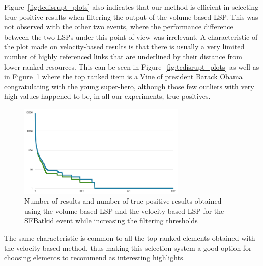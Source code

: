 \documentclass{sig-alternate}
\begin{document}
Figure~\ref{fig:tcdisrupt_plots} also indicates that our method is efficient in selecting true-positive results when filtering the output of the volume-based LSP. This was not observed with the other two events, where the performance difference between the two LSPs under this point of view was irrelevant. A characteristic of the plot made on velocity-based results is that there is usually a very limited number of highly referenced links that are underlined by their distance from lower-ranked resources. This can be seen in Figure~\ref{fig:tcdisrupt_plots} as well as in Figure~\ref{fig:sfbatkid_plot} where the top ranked item is a Vine of president Barack Obama congratulating with the young super-hero, although those few outliers with very high values happened to be, in all our experiments, true positives.
\begin{figure}[htbp]
  \centering
  \includegraphics[width=8cm]{Figures/batkid_plot.png}
  \caption{Number of results and number of true-positive results obtained using the volume-based LSP and the velocity-based LSP for the SFBatkid event while increasing the filtering thresholds}
  \label{fig:sfbatkid_plot}
\end{figure}

The same characteristic is common to all the top ranked elements obtained with the velocity-based method, thus making this selection system a good option for choosing elements to recommend as interesting highlights.
\end{document}
